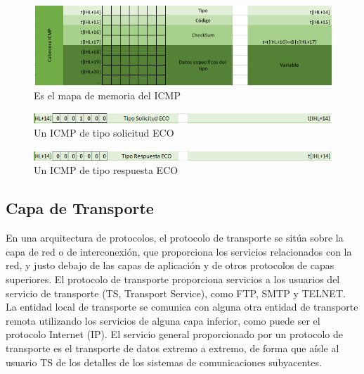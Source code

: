 	\begin{figure}[h]
			\centering		
			\includegraphics[width=\textwidth]{MapaMemoriaICMP}
			\caption{Es el mapa de memoria del ICMP}
	\end{figure}
	\begin{figure}[h]
			\centering		
			\includegraphics[width=\textwidth]{ICMPSECO}
			\caption{Un ICMP de tipo solicitud ECO}
	\end{figure}
	\begin{figure}[h]
			\centering		
			\includegraphics[width=\textwidth]{ICMPRECO}
			\caption{Un ICMP de tipo respuesta ECO}
	\end{figure}
\clearpage
	\subsection{Capa de Transporte}
		En una arquitectura de protocolos, el protocolo de transporte se sit\'ua sobre la capa de red o de interconexi\'on, que proporciona los servicios relacionados con la red, y justo debajo de las capas de aplicaci\'on y de otros protocolos de capas superiores. El protocolo de transporte proporciona servicios a los usuarios del servicio de transporte (TS, Transport Service), como FTP, SMTP y TELNET. La entidad local de transporte se comunica con alguna otra entidad de transporte remota utilizando los servicios de alguna capa inferior, como puede ser el protocolo Internet (IP). El servicio general proporcionado por un protocolo de transporte es el transporte de datos extremo a extremo, de forma que a\'isle al usuario TS de los detalles de los sistemas de comunicaciones subyacentes.
